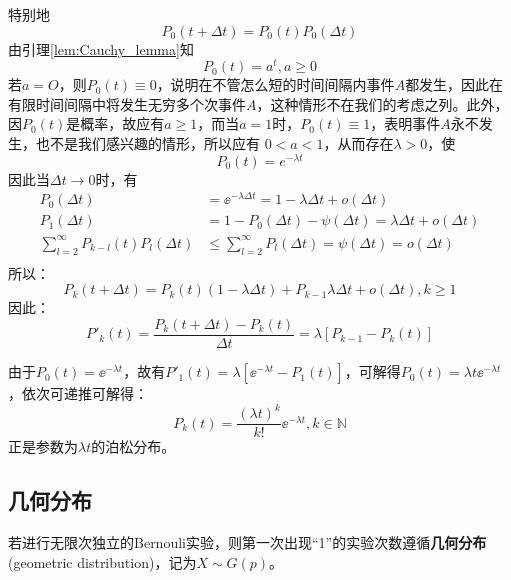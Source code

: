 特别地
\[ P_0(t+\Delta t)=P_0(t)P_0(\Delta t) \]
由引理\ref{lem:Cauchy_lemma}知
\[ P_0(t)=a^{t}, a\ge 0 \]
若$a=O$，则$P_0(t) \equiv 0$，说明在不管怎么短的时间间隔内事件$A$都发生，因此在有限时间间隔中将发生无穷多个次事件$A$，这种情形不在我们的考虑之列。此外，因$P_0(t)$是概率，故应有$a\ge 1$，而当$a=1$时，$P_0(t) \equiv 1$，表明事件$A$永不发生，也不是我们感兴趣的情形，所以应有 $0<a<1$，从而存在$\lambda>0$，使
\[ P_0(t)=e^{-\lambda t} \]
因此当$\Delta t \to 0$时，有
\begin{align*}
    P_{0}(\Delta t)                                & =\ee^{-\lambda \Delta t}=1-\lambda \Delta t+o(\Delta t)                  \\
    P_{1}(\Delta t)                                & =1-P_{0}(\Delta t)-\psi(\Delta t)=\lambda \Delta t+o(\Delta t)           \\
    \sum_{l=2}^{\infty} P_{k-l}(t) P_{l}(\Delta t) & \leqslant \sum_{l=2}^{\infty} P_{l}(\Delta t)=\psi(\Delta t)=o(\Delta t) \\
\end{align*}
所以：
\[ P_k(t+\Delta t)=P_k(t)(1-\lambda \Delta t) + P_{k-1}\lambda \Delta t+ o(\Delta t) ,k\ge 1\]
因此：
\[ P'_k(t)= \frac{P_k(t+\Delta t)-P_k(t)}{\Delta t} = \lambda[P_{k-1}-P_k(t)] \]

由于$P_0(t)=\ee^{-\lambda t}$，故有$P'_1(t)=\lambda[\ee^{-\lambda t}-P_1(t)]$，可解得$P_0(t)=\lambda t \ee^{-\lambda t}$，依次可递推可解得：
\[ P_k(t)=\frac{(\lambda t)^k}{k!}\ee^{-\lambda t}, k \in \mathbb{N}\]
正是参数为$\lambda t$的泊松分布。

\subsection{几何分布}

\begin{definition}
    若进行无限次独立的Bernouli实验，则第一次出现“1”的实验次数遵循\textbf{几何分布}(geometric distribution)，记为$X \sim G(p)$。
\end{definition}

